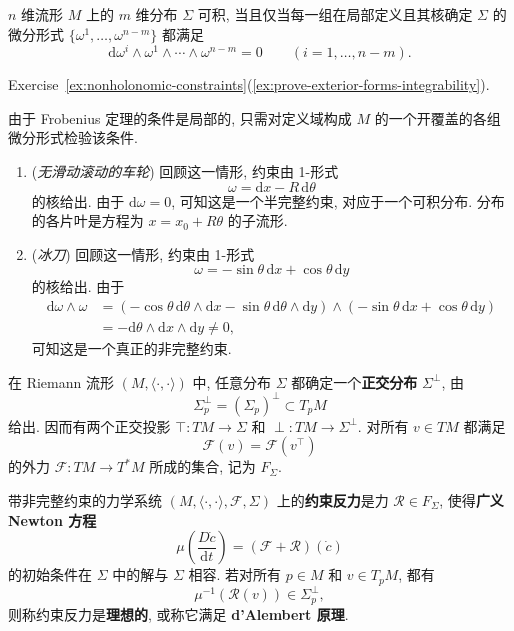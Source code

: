 \begin{RiemannProposition}\label{prop:integrability-by-exterior-forms}
$n$ 维流形 $M$ 上的 $m$ 维分布 $\Sigma$ 可积, 当且仅当每一组在局部定义且其核确定 $\Sigma$ 的微分形式 $\{\omega^1,\ldots,\omega^{n-m}\}$ 都满足
\[
  \mathrm{d}\omega^i\wedge\omega^1\wedge\cdots\wedge\omega^{n-m}=0
  \qquad(i=1,\ldots,n-m).
\]
\end{RiemannProposition}

\begin{RiemannProof}
Exercise~\ref{ex:nonholonomic-constraints}(\ref{ex:prove-exterior-forms-integrability}).
\end{RiemannProof}

由于 Frobenius 定理的条件是局部的, 只需对定义域构成 $M$ 的一个开覆盖的各组微分形式检验该条件.

\begin{RiemannExample}\label{ex:integrability-for-wheel-and-skate}
\begin{enumerate}[label=(\arabic*),ref=\arabic*,leftmargin=*]
\item\label{ex:integrability-of-rolling-wheel-constraint} (\emph{无滑动滚动的车轮}) 回顾这一情形, 约束由 1-形式
\[
  \omega=\mathrm{d}x-R\,\mathrm{d}\theta
\]
的核给出. 由于 $\mathrm{d}\omega=0$, 可知这是一个半完整约束, 对应于一个可积分布. 分布的各片叶是方程为 $x=x_0+R\theta$ 的子流形.
\item\label{ex:nonintegrability-of-skate-constraint} (\emph{冰刀}) 回顾这一情形, 约束由 1-形式
\[
  \omega=-\sin\theta\,\mathrm{d}x+\cos\theta\,\mathrm{d}y
\]
的核给出. 由于
\begin{align*}
  \mathrm{d}\omega\wedge\omega
  &=(-\cos\theta\,\mathrm{d}\theta\wedge\mathrm{d}x-\sin\theta\,\mathrm{d}\theta\wedge\mathrm{d}y)
    \wedge(-\sin\theta\,\mathrm{d}x+\cos\theta\,\mathrm{d}y)\\
  &=-\mathrm{d}\theta\wedge\mathrm{d}x\wedge\mathrm{d}y\ne 0,
\end{align*}
可知这是一个真正的非完整约束.
\end{enumerate}
\end{RiemannExample}

在 Riemann 流形 $(M,\langle\cdot,\cdot\rangle)$ 中, 任意分布 $\Sigma$ 都确定一个\textbf{正交分布} $\Sigma^\perp$, 由
\[
  \Sigma_p^\perp=(\Sigma_p)^\perp\subset T_pM
\]
给出. 因而有两个正交投影 $\top:TM\to\Sigma$ 和 $\perp:TM\to\Sigma^\perp$. 对所有 $v\in TM$ 都满足
\[
  \mathcal{F}(v)=\mathcal{F}(v^\top)
\]
的外力 $\mathcal{F}:TM\to T^*M$ 所成的集合, 记为 $F_\Sigma$.

\begin{RiemannDefinition}\label{def:reaction-force-for-nonholonomic-constraint}
带非完整约束的力学系统 $(M,\langle\cdot,\cdot\rangle,\mathcal{F},\Sigma)$ 上的\textbf{约束反力}是力 $\mathcal{R}\in F_\Sigma$, 使得\textbf{广义 Newton 方程}
\[
  \mu\left(\frac{D\dot c}{\mathrm{d}t}\right)
  =(\mathcal{F}+\mathcal{R})(\dot c)
\]
的初始条件在 $\Sigma$ 中的解与 $\Sigma$ 相容. 若对所有 $p\in M$ 和 $v\in T_pM$, 都有
\[
  \mu^{-1}(\mathcal{R}(v))\in\Sigma_p^\perp,
\]
则称约束反力是\textbf{理想的}, 或称它满足 \textbf{d’Alembert 原理}.
\end{RiemannDefinition}

